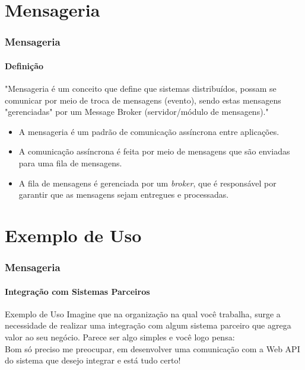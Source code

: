 \documentclass[
	9pt, %
	t, %
]{beamer}
\newcommand{\yellowbox}[1]{\colorbox{yellow!75}{#1}}
\begin{document}
\section{Mensageria}


\begin{frame}
	\frametitle{Mensageria}
	\framesubtitle{Definição}

	"Mensageria é um conceito que define que sistemas distribuídos, possam se comunicar por meio de troca de mensagens (evento), sendo estas mensagens "gerenciadas" por um Message Broker (servidor/módulo de mensagens)."

	\begin{itemize}
		\item A mensageria é um padrão de comunicação \yellowbox{assíncrona} entre
		      aplicações.
		\item A comunicação assíncrona é feita por meio de mensagens que são enviadas para
		      uma \yellowbox{fila de mensagens}.
		\item A fila de mensagens é gerenciada por um \textit{broker}, que é responsável por
		      garantir que as mensagens sejam entregues e processadas.
	\end{itemize}

\end{frame}


\section{Exemplo de Uso}

\begin{frame}
	\frametitle{Mensageria}
	\framesubtitle{Integração com Sistemas Parceiros}

	\begin{block}{Exemplo de Uso}
		Imagine que na organização na qual você trabalha, surge a necessidade de realizar uma integração com algum sistema parceiro que agrega valor ao seu negócio. Parece ser algo simples e você logo pensa:
		\\ \bigskip
		\alert{Bom só preciso me preocupar, em desenvolver uma comunicação com a Web API do sistema que desejo integrar e está tudo certo!}

	\end{block}

\end{frame}
\end{document}
